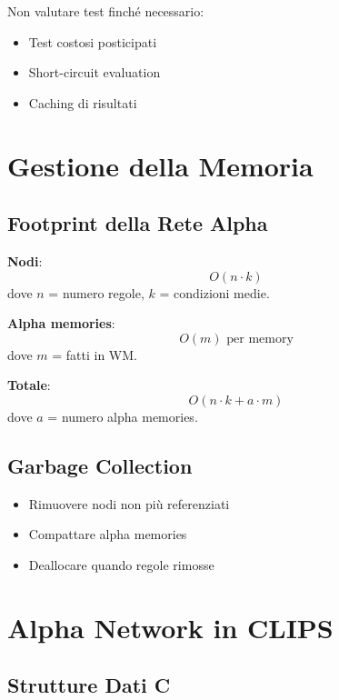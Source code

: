Non valutare test finché necessario:

\begin{itemize}
\item Test costosi posticipati
\item Short-circuit evaluation
\item Caching di risultati
\end{itemize}

\section{Gestione della Memoria}

\subsection{Footprint della Rete Alpha}

\textbf{Nodi}:
\begin{equation}
O(n \cdot k)
\end{equation}
dove $n$ = numero regole, $k$ = condizioni medie.

\textbf{Alpha memories}:
\begin{equation}
O(m) \text{ per memory}
\end{equation}
dove $m$ = fatti in WM.

\textbf{Totale}:
\begin{equation}
O(n \cdot k + a \cdot m)
\end{equation}
dove $a$ = numero alpha memories.

\subsection{Garbage Collection}

\begin{itemize}
\item Rimuovere nodi non più referenziati
\item Compattare alpha memories
\item Deallocare quando regole rimosse
\end{itemize}

\section{Alpha Network in CLIPS}

\subsection{Strutture Dati C}

